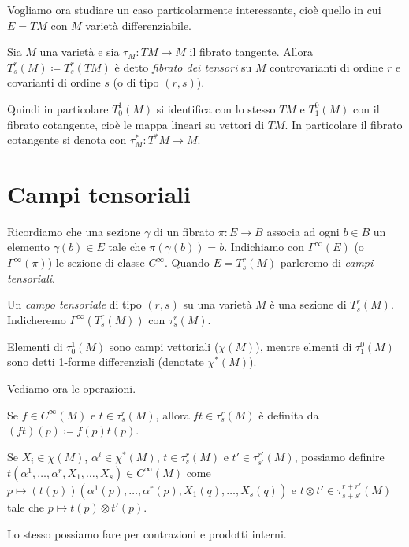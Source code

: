 Vogliamo ora studiare un caso particolarmente interessante, cioè quello in cui $E = TM$ con $M$ varietà differenziabile. %

\begin{definition}
	Sia $M$ una varietà e sia $\tau_M : TM \to M$ il fibrato tangente. Allora $T_s^r(M) \coloneqq T_s^r(TM)$ è detto \emph{fibrato dei tensori} su $M$ controvarianti di ordine $r$ e covarianti di ordine $s$ (o di tipo $(r,s)$).
\end{definition}

Quindi in particolare $T_0^1(M)$ si identifica con lo stesso $TM$ e $T_1^0(M)$ con il fibrato cotangente, cioè le mappa lineari su vettori di $TM$.
In particolare il fibrato cotangente si denota con $\tau_M^* : T^*M \to M$.

\section{Campi tensoriali}

Ricordiamo che una sezione $\gamma$ di un fibrato $\pi : E \to B$ associa ad ogni $b \in B$ un elemento $\gamma(b) \in E$ tale che $\pi(\gamma(b)) = b$.
Indichiamo con $\Gamma^\infty(E)$ (o $\Gamma^\infty(\pi)$) le sezione di classe $C^\infty$.
Quando $E = T_s^r(M)$ parleremo di \emph{campi tensoriali}.

\begin{definition}
	Un \emph{campo tensoriale} di tipo $(r,s)$ su una varietà $M$ è una sezione di $T_s^r(M)$. Indicheremo $\Gamma^\infty(T_s^r(M))$ con $\tau_s^r(M)$. %
	
	Elementi di $\tau_0^1(M)$ sono campi vettoriali ($\chi(M)$), mentre elmenti di $\tau_1^0(M)$ sono detti 1-forme differenziali (denotate $\chi^*(M)$).
\end{definition}

Vediamo ora le operazioni.

Se $f \in C^\infty(M)$ e $t \in \tau_s^r(M)$, allora $ft \in \tau_s^r(M)$ è definita da $(ft)(p) \coloneqq f(p) t(p)$.

Se $X_i \in \chi(M)$, $\alpha^i \in \chi^*(M)$, $t \in \tau_s^r(M)$ e $t' \in \tau_{s'}^{r'}(M)$, possiamo definire $t(\alpha^1,\ldots,\alpha^r,X_1,\ldots, X_s) \in C^\infty(M)$ come $p \mapsto (t(p))(\alpha^1(p),\ldots,\alpha^r(p),X_1(q),\ldots, X_s(q))$ e $t\otimes t' \in \tau_{s+s'}^{r+r'}(M)$ tale che $p \mapsto t(p)\otimes t'(p)$.

Lo stesso possiamo fare per contrazioni e prodotti interni. %

